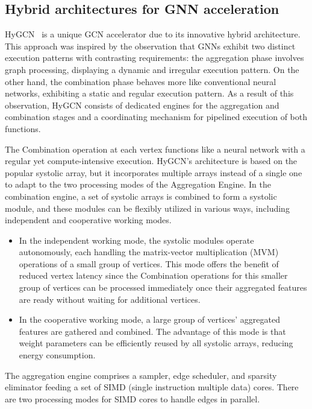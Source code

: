 \subsection{Hybrid architectures for GNN acceleration}
\label{subsec:hybrid-architectures}%

HyGCN~\cite{DBLP:journals/corr/abs-2001-02514} is a unique GCN accelerator due to its innovative hybrid architecture.
This approach was inspired by the observation that GNNs exhibit two distinct execution patterns with contrasting requirements: the aggregation phase involves graph processing, displaying a dynamic and irregular execution pattern.
On the other hand, the combination phase behaves more like conventional neural networks, exhibiting a static and regular execution pattern.
As a result of this observation, HyGCN consists of dedicated engines for the aggregation and combination stages and a coordinating mechanism for pipelined execution of both functions.

The Combination operation at each vertex functions like a neural network with a regular yet compute-intensive execution.
HyGCN's architecture is based on the popular systolic array, but it incorporates multiple arrays instead of a single one to adapt to the two processing modes of the Aggregation Engine.
In the combination engine, a set of systolic arrays is combined to form a systolic module, and these modules can be flexibly utilized in various ways, including independent and cooperative working modes.

\begin{itemize}
    \item In the independent working mode, the systolic modules operate autonomously, each handling the matrix-vector multiplication (MVM) operations of a small group of vertices.
          This mode offers the benefit of reduced vertex latency since the Combination operations for this smaller group of vertices can be processed immediately once their aggregated features are ready without waiting for additional vertices.
    \item In the cooperative working mode, a large group of vertices' aggregated features are gathered and combined.
          The advantage of this mode is that weight parameters can be efficiently reused by all systolic arrays, reducing energy consumption.
\end{itemize}

The aggregation engine comprises a sampler, edge scheduler, and sparsity eliminator feeding a set of SIMD (single instruction multiple data) cores.
There are two processing modes for SIMD cores to handle edges in parallel.

